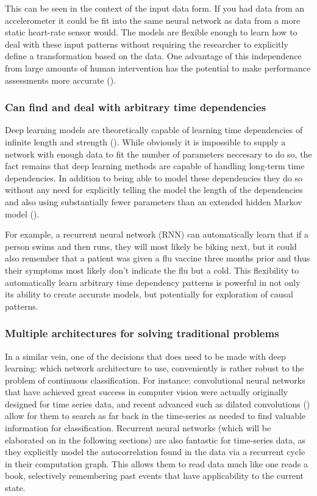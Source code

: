 \documentclass[]{book}
\theoremstyle{definition}
\theoremstyle{definition}
\theoremstyle{definition}
\theoremstyle{remark}
\begin{document}
This can be seen in the context of the input data form. If you had data
from an accelerometer it could be fit into the same neural network as
data from a more static heart-rate sensor would. The models are flexible
enough to learn how to deal with these input patterns without requiring
the researcher to explicitly define a transformation based on the data.
One advantage of this independence from large amounts of human
intervention has the potential to make performance assessments more
accurate (\citet{rms}).

\subsubsection{Can find and deal with arbitrary time
dependencies}\label{can-find-and-deal-with-arbitrary-time-dependencies}

Deep learning models are theoretically capable of learning time
dependencies of infinite length and strength
(\citet{universal_approximators}). While obviously it is impossible to
supply a network with enough data to fit the number of parameters
neccesary to do so, the fact remains that deep learning methods are
capable of handling long-term time dependencies. In addition to being
able to model these dependencies they do so without any need for
explicitly telling the model the length of the dependencies and also
using substantially fewer parameters than an extended hidden Markov
model (\citet{graves_rnn}).

For example, a recurrent neural network (RNN) can automatically learn
that if a person swims and then runs, they will most likely be biking
next, but it could also remember that a patient was given a flu vaccine
three months prior and thus their symptoms most likely don't indicate
the flu but a cold. This flexibility to automatically learn arbitrary
time dependency patterns is powerful in not only its ability to create
accurate models, but potentially for exploration of causal patterns.

\subsubsection{Multiple architectures for solving traditional
problems}\label{multiple-architectures-for-solving-traditional-problems}

In a similar vein, one of the decisions that does need to be made with
deep learning: which network architecture to use, conveniently is rather
robust to the problem of continuous classification. For instance:
convolutional neural networks that have achieved great success in
computer vision were actually originally designed for time series data,
and recent advanced such as dilated convolutions
(\citet{dilated_convolutions}) allow for them to search as far back in
the time-series as needed to find valuable information for
classification. Recurrent neural networks (which will be elaborated on
in the following sections) are also fantastic for time-series data, as
they explicitly model the autocorrelation found in the data via a
recurrent cycle in their computation graph. This allows them to read
data much like one reads a book, selectively remembering past events
that have applicability to the current state.
\end{document}
